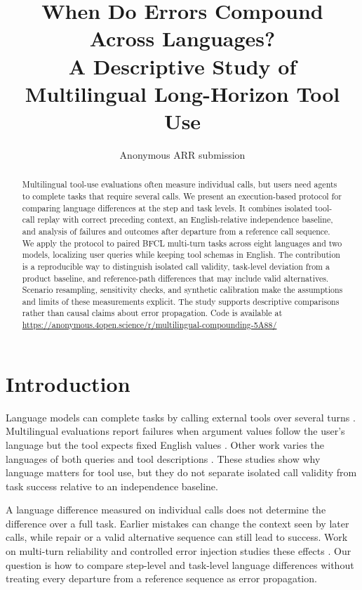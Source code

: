 \documentclass[11pt]{article}
\title{When Do Errors Compound Across Languages?\\
A Descriptive Study of Multilingual Long-Horizon Tool Use}
\author{Anonymous ARR submission}
\begin{document}
\maketitle

\begin{abstract}
Multilingual tool-use evaluations often measure individual calls, but users
need agents to complete tasks that require several calls. We present an
execution-based protocol for comparing language differences at the step and
task levels. It combines isolated tool-call replay with correct preceding
context, an English-relative independence baseline, and analysis of failures
and outcomes after departure from a reference call sequence. We apply the
protocol to paired BFCL multi-turn tasks across eight languages and two
models, localizing user queries while keeping tool schemas in English.
The contribution is a reproducible way to distinguish isolated call validity,
task-level deviation from a product baseline, and reference-path differences
that may include valid alternatives. Scenario resampling, sensitivity checks,
and synthetic calibration make the assumptions and limits of these
measurements explicit. The study supports descriptive comparisons rather
than causal claims about error propagation. Code is available at \url{https://anonymous.4open.science/r/multilingual-compounding-5A88/}
\end{abstract}

\section{Introduction}
\label{sec:intro}

Language models can complete tasks by calling external tools over several
turns \citep{patil2025bfcl,yao2025taubench}. Multilingual evaluations report
failures when argument values follow the user's language but the tool expects
fixed English values \citep{mlcl2026}. Other work varies the languages of both
queries and tool descriptions \citep{arabicenglish2026}. These studies show
why language matters for tool use, but they do not separate isolated call
validity from task success relative to an independence baseline.

A language difference measured on individual calls does not determine the
difference over a full task. Earlier mistakes can change the context seen by
later calls, while repair or a valid alternative sequence can still lead to
success. Work on multi-turn reliability and controlled error injection
studies these effects \citep{turnwise2026,agentprop2026}. Our question is how
to compare step-level and task-level language differences without treating
every departure from a reference sequence as error propagation.
\end{document}
